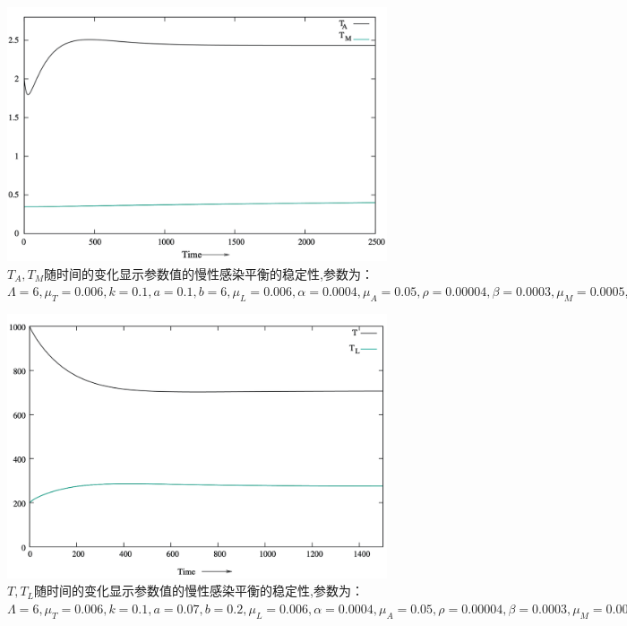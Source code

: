 \documentclass[12pt,a4paper]{article}
\begin{document}
{	\begin{figure}[H]
		\centering
		\includegraphics[width=4.5in]{Snip20190310_5.png}
		\caption
		{$T_{A},T_{M}$随时间的变化显示参数值的慢性感染平衡的稳定性,参数为：
		$\Lambda=6,\mu_{T}=0.006,k=0.1, a=0.1,b=6,\mu_{L}=0.006,\alpha=0.0004,
		\mu_{A}=0.05,\rho=0.00004,\beta=0.0003,\mu_{M}=0.0005,T_{M_{max}}=2200$}
	\end{figure}

	\begin{figure}[H]
		\centering
		\includegraphics[width=4.5in]{Snip20190310_6.png}
		\caption
		{$T,T_{L}$随时间的变化显示参数值的慢性感染平衡的稳定性,参数为：
		$\Lambda=6,\mu_{T}=0.006,k=0.1, a=0.07,b=0.2,\mu_{L}=0.006,\alpha=0.0004,
		\mu_{A}=0.05,\rho=0.00004,\beta=0.0003,\mu_{M}=0.0005,T_{M_{max}}=2200$}
	\end{figure}
	
}
\end{document}
